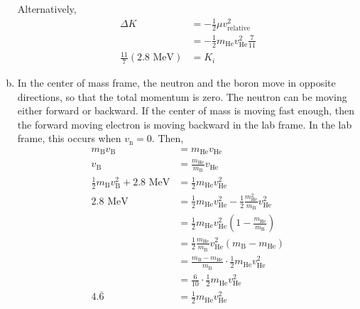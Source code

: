 \documentclass{esg8012pset}
\begin{document}
\begin{solution}
\begin{enumerate}[a)]
  Alternatively, \begin{align*} \Delta K & = -\frac{1}{2}\mu v_{\text{relative}}^2 \\
    & = -\frac{1}{2} m_{\text{He}} v_{\text{He}}^2 \frac{7}{11} \\
    \frac{11}{7}(2.8\text{ MeV}) & = K_i
    \end{align*}
    \item In the center of mass frame, the neutron and the boron move in opposite directions, so that the total momentum is zero.  The neutron can be moving either forward or backward.  If the center of mass is moving fast enough, then the forward moving electron is moving backward in the lab frame.  In the lab frame, this occurs when $v_{\text{n}} = 0$.  Then, \begin{align*}
      m_{\text{B}}v_{\text{B}} & = m_{\text{He}}v_{\text{He}} \\
      v_{\text{B}} & = \frac{m_{\text{He}}}{m_{\text{B}}}v_{\text{He}} \\
      \frac{1}{2}m_{\text{B}}v_{\text{B}}^2 + 2.8\text{ MeV} & = \frac{1}{2}m_{\text{He}}v_{\text{He}}^2 \\
      2.8\text{ MeV} & = \frac{1}{2}m_{\text{He}}v_{\text{He}}^2 - \frac{1}{2}\frac{m_{\text{He}}^2}{m_{\text{B}}}v_{\text{He}}^2 \\
      & = \frac{1}{2}m_{\text{He}}v_{\text{He}}^2\left(1 - \frac{m_{\text{He}}}{m_{\text{B}}}\right) \\
      & = \frac{1}{2}\frac{m_{\text{He}}}{m_{\text{B}}}v_{\text{He}}^2(m_{\text{B}} - m_{\text{He}}) \\
      & = \frac{m_{\text{B}} - m_{\text{He}}}{m_{\text{B}}} \cdot \frac{1}{2}m_{\text{He}}v_{\text{He}}^2 \\
      & = \frac{6}{10} \cdot \frac{1}{2}m_{\text{He}}v_{\text{He}}^2 \\
    4.\overline{6} & = \frac{1}{2}m_{\text{He}}v_{\text{He}}^2
    \end{align*}

\end{enumerate}
\end{solution}
\end{document}
